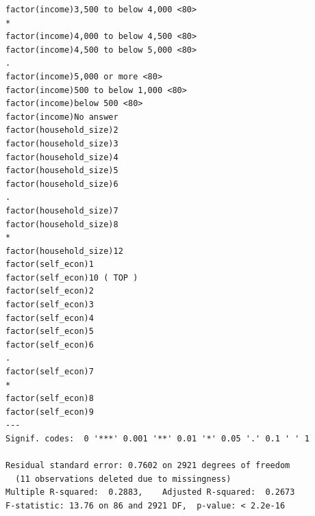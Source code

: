 \documentclass[
]{article}
\begin{document}
\begin{table}
\begin{minipage}[t]{\linewidth}
{\begin{verbatim}
factor(income)3,500 to below 4,000 <80>                                           *  
factor(income)4,000 to below 4,500 <80>                                              
factor(income)4,500 to below 5,000 <80>                                           .  
factor(income)5,000 or more <80>                                                     
factor(income)500 to below 1,000 <80>                                                
factor(income)below 500 <80>                                                         
factor(income)No answer                                                              
factor(household_size)2                                                              
factor(household_size)3                                                              
factor(household_size)4                                                              
factor(household_size)5                                                              
factor(household_size)6                                                           .  
factor(household_size)7                                                              
factor(household_size)8                                                           *  
factor(household_size)12                                                             
factor(self_econ)1                                                                   
factor(self_econ)10 ( TOP )                                                          
factor(self_econ)2                                                                   
factor(self_econ)3                                                                   
factor(self_econ)4                                                                   
factor(self_econ)5                                                                   
factor(self_econ)6                                                                .  
factor(self_econ)7                                                                *  
factor(self_econ)8                                                                   
factor(self_econ)9                                                                   
---
Signif. codes:  0 '***' 0.001 '**' 0.01 '*' 0.05 '.' 0.1 ' ' 1

Residual standard error: 0.7602 on 2921 degrees of freedom
  (11 observations deleted due to missingness)
Multiple R-squared:  0.2883,    Adjusted R-squared:  0.2673 
F-statistic: 13.76 on 86 and 2921 DF,  p-value: < 2.2e-16
\end{verbatim}

}


\end{minipage}
\end{table}
\end{document}
